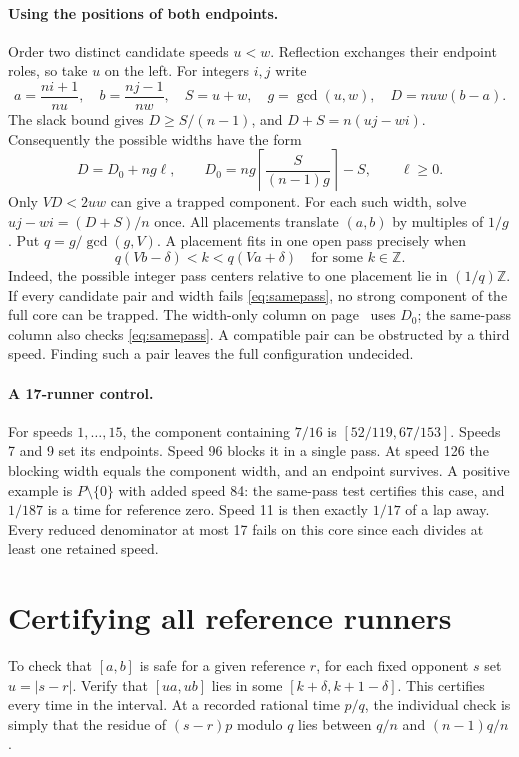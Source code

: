 \documentclass[11pt,letterpaper]{article}
\begin{document}
\paragraph{Using the positions of both endpoints.}
Order two distinct candidate speeds \(u<w\). Reflection exchanges their endpoint roles, so take \(u\) on the left. For integers \(i,j\) write
\[
a=\frac{ni+1}{nu},\quad b=\frac{nj-1}{nw},\quad
S=u+w,\quad g=\gcd(u,w),\quad D=nuw(b-a).
\]
The slack bound gives \(D\ge S/(n-1)\), and \(D+S=n(uj-wi)\). Consequently the possible widths have the form
\[
D=D_0+ng\ell,\qquad D_0=ng\left\lceil\frac{S}{(n-1)g}\right\rceil-S,\qquad \ell\ge0 .
\]
Only \(VD<2uw\) can give a trapped component. For each such width, solve \(uj-wi=(D+S)/n\) once. All placements translate \((a,b)\) by multiples of \(1/g\). Put \(q=g/\gcd(g,V)\). A placement fits in one open pass precisely when
\begin{equation}\label{eq:samepass}
q(Vb-\delta)< k <q(Va+\delta)\quad\text{for some }k\in\mathbb Z .
\end{equation}
Indeed, the possible integer pass centers relative to one placement lie in \((1/q)\mathbb Z\). If every candidate pair and width fails \eqref{eq:samepass}, no strong component of the full core can be trapped. The width-only column on page~\pageref{sec:data} uses \(D_0\); the same-pass column also checks \eqref{eq:samepass}. A compatible pair can be obstructed by a third speed. Finding such a pair leaves the full configuration undecided.

\paragraph{A 17-runner control.}
For speeds \(1,\ldots,15\), the component containing \(7/16\) is \([52/119,67/153]\). Speeds 7 and 9 set its endpoints. Speed 96 blocks it in a single pass. At speed 126 the blocking width equals the component width, and an endpoint survives. A positive example is \(P\setminus\{0\}\) with added speed 84: the same-pass test certifies this case, and \(1/187\) is a time for reference zero. Speed 11 is then exactly \(1/17\) of a lap away. Every reduced denominator at most 17 fails on this core since each divides at least one retained speed.

\newpage
\section{Certifying all reference runners}\label{sec:cert}
To check that \([a,b]\) is safe for a given reference \(r\), for each fixed opponent \(s\) set \(u=|s-r|\). Verify that \([ua,ub]\) lies in some \([k+\delta,k+1-\delta]\). This certifies every time in the interval. At a recorded rational time \(p/q\), the individual check is simply that the residue of \((s-r)p\) modulo \(q\) lies between \(q/n\) and \((n-1)q/n\).
\end{document}
